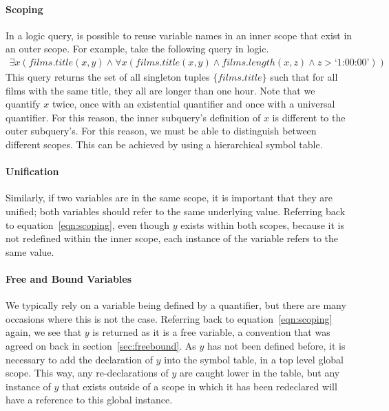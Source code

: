 \documentclass[a4paper, 11pt]{article}
\begin{document}
      \paragraph{Scoping}
        In a logic query, is possible to reuse variable names in an inner
        scope that exist in an outer scope. For example, take the following
        query in logic.
        \begin{gather}
        \exists x(films.title(x, y) \land \forall x(films.title(x, y) \land
        films.length(x, z) \land z > \text{`1:00:00'})) \label{eqn:scoping}
        \end{gather}
        This query returns the set of all singleton tuples $\{films.title\}$ such
        that for all films with the same title, they all are longer than one
        hour. Note that we quantify $x$ twice, once with an existential
        quantifier and once with a universal quantifier. For this reason, the
        inner subquery's definition of $x$ is different to the outer subquery's.
        For this reason, we must be able to distinguish between different
        scopes. This can be achieved by using a hierarchical symbol table.

      \paragraph{Unification}
        Similarly, if two variables are in the same scope, it is important that
        they are unified; both variables should refer to the same underlying
        value. Referring back to equation~\ref{eqn:scoping}, even
        though $y$ exists within both scopes, because it is not redefined
        within the inner scope, each instance of the variable refers to the 
        same value.

      \paragraph{Free and Bound Variables}
        We typically rely on a variable being defined by a quantifier, but
        there are many occasions where this is not the case. Referring back to
        equation~\ref{eqn:scoping} again, we see that $y$ is returned as it is a
        free variable, a convention that was agreed on back in
        section~\ref{sec:freebound}. As $y$ has not been defined before, it is
        necessary to add the declaration of $y$ into the symbol table, in a top
        level global scope. This way, any re-declarations of $y$ are caught
        lower in the table, but any instance of $y$ that exists outside of a
        scope in which it has been redeclared will have a reference to this
        global instance.
\end{document}
